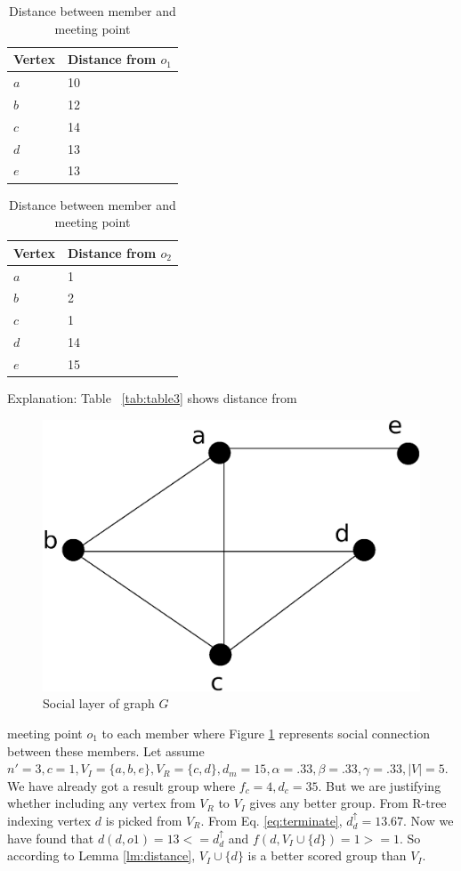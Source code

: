\documentclass{vldb}
\begin{document}
		
	\begin{table}
	\caption{Distance between member and meeting point }
		\begin{minipage}{.5\columnwidth}
				\begin{tabular}{|l|l|}
				\hline
				Vertex & Distance from $ o_{1} $
				\\
				\hline
				$ a $& 10
				\\
				\hline
				$ b $& 12
				\\
				\hline
				$ c $& 14\\
				\hline
				$ d $& 13\\
				\hline
				$ e $& 13	
				\\
				\hline	  	
				
				
				\end{tabular}
				\label{tab:table3}
			
\end{minipage}%
    \begin{minipage}{.5\columnwidth}
		\centering
		\begin{tabular}{|l|l|}
						\hline
						Vertex & Distance from $ o_{2} $
						\\
						\hline
						$ a $& 1
						\\
						\hline
						$ b $& 2
						\\
						\hline
						$ c $& 1\\
						\hline
						$ d $& 14\\
						\hline
						$ e $& 15	
						\\
						\hline	  	
						
						
						\end{tabular}
						\label{tab:table4}
						\end{minipage} 
						\end{table}		
					
				
				
			
			
		{Explanation:} Table ~\ref{tab:table3} shows distance from
		\begin{figure}				\includegraphics[width=.3\columnwidth]{connection}
		\caption{Social layer of graph $ G $}
		\label{fig:meet}
		\end{figure}  meeting point $ o_{1} $ to each member where  Figure \ref{fig:meet} represents social connection between these members. Let assume $ n'=3,c=1, V_I=\{a,b,e\}, V_R=\{c,d\} ,d_{m}=15, \alpha=.33, \beta=.33, \gamma =.33,|V|=5$. We have
		already got a result group where $ f_{c}=4 , d_{c} =35 $. But we
		are justifying whether including any vertex from $ V_R $ to  
		$V_I $ gives any better group. From R-tree indexing vertex $ d  $ is picked from $ V_R $. From Eq. \eqref{eq:terminate}, $ d_d^\uparrow=13.67 $. Now we have found that $ d(d,o1)=13<=d_d^\uparrow $ and $ f(d,V_I \cup \{d\}) =1 >=1 $. So according to Lemma \ref{lm:distance}, $ V_I \cup \{d\} $ is a better scored group than $ V_I $.
\end{document}
